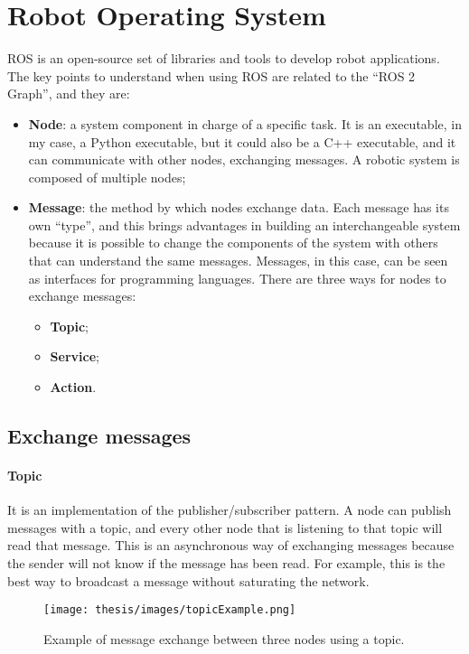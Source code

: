 \documentclass[../thesis.tex]{subfiles}
\begin{document}
\section{Robot Operating System}
\acrfull{ROS} is an open-source set of libraries and tools to develop robot applications. The key points to understand when using \acrshort{ROS} are related to the ``ROS 2 Graph'', and they are:
\begin{itemize}
    \item \textbf{Node}: a system component in charge of a specific task. It is an executable, in my case, a Python executable, but it could also be a C++ executable, and it can communicate with other nodes, exchanging messages. A robotic system is composed of multiple nodes; 
    \item \textbf{Message}: the method by which nodes exchange data. Each message has its own ``type'', and this brings advantages in building an interchangeable system because it is possible to change the components of the system with others that can understand the same messages. Messages, in this case, can be seen as interfaces for programming languages. There are three ways for nodes to exchange messages: 
        \begin{itemize}
            \item \textbf{Topic};
            \item \textbf{Service};
            \item \textbf{Action}.
        \end{itemize}
\end{itemize}
\subsection{Exchange messages}
\paragraph{Topic}
It is an implementation of the publisher/subscriber pattern. A node can publish messages with a topic, and every other node that is listening to that topic will read that message. This is an asynchronous way of exchanging messages because the sender will not know if the message has been read. For example, this is the best way to broadcast a message without saturating the network. 
\begin{figure}[H]
    \centering
    \texttt{[image: thesis/images/topicExample.png]}
    \caption{Example of message exchange between three nodes using a topic.}
    \label{fig:exampleTopicExchangeMessage}
\end{figure}
\end{document}
